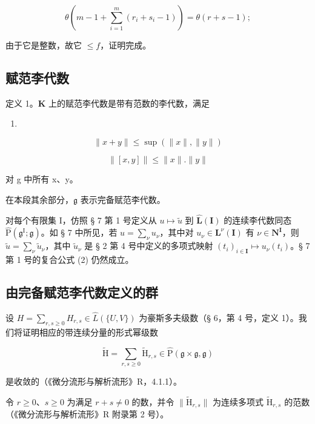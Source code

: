\[
\theta (m - 1 + \sum_ {i = 1} ^ {m} \left(r _ {i} + s _ {i} - 1\right)) = \theta (r + s - 1);
\]

由于它是整数，故它 \(\leqslant f\)，证明完成。

\subsection{赋范李代数}

定义 1。\(\mathbf{K}\) 上的赋范李代数是带有范数的李代数，满足

\begin{enumerate}
\def\labelenumi{(\arabic{enumi})}
\setcounter{enumi}{7}
\tightlist
\item
\end{enumerate}

\[
\| x + y \| \leqslant \sup (\| x \|, \| y \|)\tag{8}
\]

\[
\| [ x, y ] \| \leqslant \| x \|. \| y \|\tag{9}
\]

对 g 中所有 x、y。

在本段其余部分，\(\mathfrak{g}\) 表示完备赋范李代数。

对每个有限集 I，仿照 § 7 第 1 号定义从 \(u \mapsto \tilde{u}\) 到 \(\hat{\mathbf{L}}(\mathbf{I})\) 的连续李代数同态 \(\hat{\mathrm{P}}(\mathfrak{g}^{\mathrm{I}}; \mathfrak{g})\)。如 § 7 中所见，若 \(u = \sum_{\nu} u_{\nu}\)，其中对 \(u_{\nu} \in \mathbf{L}^{\nu}(\mathbf{I})\) 有 \(\nu \in \mathbf{N}^{\mathbf{I}}\)，则 \(\tilde{u} = \sum_{\nu} \tilde{u}_{\nu}\)，其中 \(\tilde{u}_{\nu}\) 是 § 2 第 4 号中定义的多项式映射 \((t_i)_{i \in \mathbf{I}} \mapsto u_{\nu}(t_i)\)。§ 7 第 1 号的复合公式 (2) 仍然成立。

\subsection{由完备赋范李代数定义的群}

设 \(H = \sum_{r,s \geq 0} H_{r,s} \in \hat{L}(\{U, V\})\) 为豪斯多夫级数（§ 6，第 4 号，定义 1）。我们将证明相应的带连续分量的形式幂级数

\[
\tilde {\mathrm{H}} = \sum_ {r, s \geqslant 0} \tilde {\mathrm{H}} _ {r, s} \in \hat {\mathrm{P}} (\mathfrak {g} \times \mathfrak {g}, \mathfrak {g})\tag{10}
\]

是收敛的（《微分流形与解析流形》R，4.1.1）。

令 \(r \geqslant 0\)、\(s \geqslant 0\) 为满足 \(r + s \neq 0\) 的数，并令 \(\| \tilde{\mathrm{H}}_{r,s} \|\) 为连续多项式 \(\tilde{\mathrm{H}}_{r,s}\) 的范数（《微分流形与解析流形》R 附录第 2 号）。

